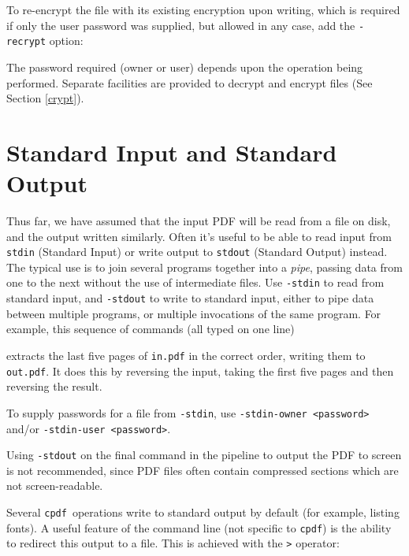 \documentclass{book}
\newcommand{\cpdf}{\texttt{cpdf}}
\begin{document}
\noindent To re-encrypt the file with its existing encryption upon writing, which is required if only the user password was supplied, but allowed in any case, add the \texttt{-recrypt} option:

\noindent{}

\noindent The password required (owner or user) depends upon the operation
being performed. Separate facilities are provided to decrypt and encrypt files
(See Section \ref{crypt}).

  \section{Standard Input and Standard Output}
 
  Thus far, we have assumed that the input PDF will be read from a file on
disk, and the output written similarly. Often it's useful to be able to read
input from \texttt{stdin} (Standard Input) or write output to \texttt{stdout}
(Standard Output) instead. The typical use is to join several programs
together into a \textit{pipe}, passing data from one to the next without the
use of intermediate files. Use \texttt{-stdin} to read from standard input, and
\texttt{-stdout} to write to standard input, either to pipe data between
multiple programs, or multiple invocations of the same program. For example, this sequence of commands (all typed on one line)

\noindent{}


\noindent extracts the last five pages of \texttt{in.pdf} in the correct order,
writing them to \texttt{out.pdf}. It does this by reversing the input, taking
the first five pages and then reversing the result.

To supply passwords for a file from \texttt{-stdin}, use \texttt{-stdin-owner <password>} and/or \texttt{-stdin-user <password>}.

Using \texttt{-stdout} on the final command in the pipeline to output the PDF
to screen is not recommended, since PDF files often contain compressed sections
which are not screen-readable.

Several \cpdf\ operations write to standard output by default (for
example, listing fonts). A useful feature of the command line (not specific to
\cpdf) is the ability to redirect this output to a file. This is
achieved with the \texttt{>} operator:
\end{document}
